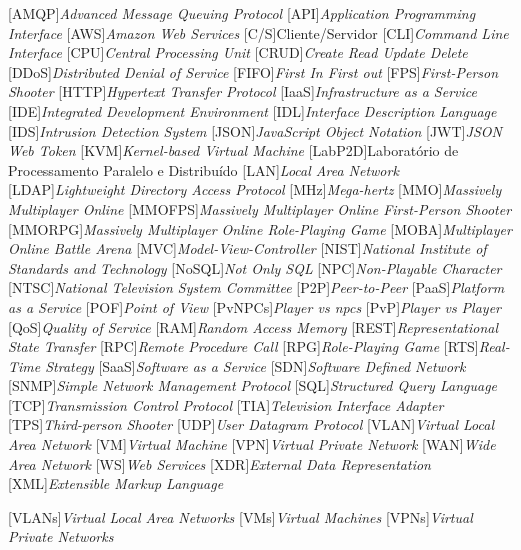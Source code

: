 \begin{acronym}[]
	[AMQP]{{\it Advanced Message Queuing Protocol}}
	[API]{{\it Application Programming Interface}}
  	[AWS]{{\it Amazon Web Services}}
	[C/S]{{Cliente/Servidor}}
	[CLI]{{\it Command Line Interface}}
	[CPU]{{\it Central Processing Unit}}
	[CRUD]{{\it Create Read Update Delete}}
	[DDoS]{{\it Distributed Denial of Service}}
	[FIFO]{{\it First In First out}}
	[FPS]{{\it First-Person Shooter}}
	[HTTP]{{\it Hypertext Transfer Protocol}}
	[IaaS]{{\it Infrastructure as a Service}}
	[IDE]{{\it Integrated Development Environment}}
	[IDL]{{\it Interface Description Language}}
  	[IDS]{{\it Intrusion Detection System}}
	[JSON]{{\it JavaScript Object Notation}}
	[JWT]{{\it JSON Web Token}}
	[KVM]{{\it Kernel-based Virtual Machine}}
	[LabP2D]{{Laboratório de Processamento Paralelo e Distribuído}}
	[LAN]{{\it Local Area Network}}
  	[LDAP]{{\it Lightweight Directory Access Protocol}}
	[MHz]{{\it Mega-hertz}}
	[MMO]{{\it Massively Multiplayer Online}}
	[MMOFPS]{{\it Massively Multiplayer Online First-Person Shooter}}
	[MMORPG]{{\it Massively Multiplayer Online Role-Playing Game}}
	[MOBA]{{\it Multiplayer Online Battle Arena}}
	[MVC]{{\it Model-View-Controller}}
	[NIST]{{\it National Institute of Standards and Technology}}
	[NoSQL]{{\it Not Only SQL}}
	[NPC]{{\it Non-Playable Character}}
	[NTSC]{{\it National Television System Committee}}
	[P2P]{{\it Peer-to-Peer}}
	[PaaS]{{\it Platform as a Service}}
	[POF]{{\it Point of View}}
	[PvNPCs]{{\it Player vs \acp{npc}}}
	[PvP]{{\it Player vs Player}}
	[QoS]{{\it Quality of Service}}
	[RAM]{{\it Random Access Memory}}
	[REST]{{\it Representational State Transfer}}
	[RPC]{{\it Remote Procedure Call}}
	[RPG]{{\it Role-Playing Game}}
	[RTS]{{\it Real-Time Strategy}}
	[SaaS]{{\it Software as a Service}}
	[SDN]{{\it Software Defined Network}}
	[SNMP]{{\it Simple Network Management Protocol}}
	[SQL]{{\it Structured Query Language}}
	[TCP]{{\it Transmission Control Protocol}}
	[TIA]{{\it Television Interface Adapter}}
	[TPS]{{\it Third-person Shooter}}
	[UDP]{{\it User Datagram Protocol}}
	[VLAN]{{\it Virtual Local Area Network}}
	[VM]{{\it Virtual Machine}}
	[VPN]{{\it Virtual Private Network}}
	[WAN]{{\it Wide Area Network}}
	[WS]{{\it Web Services}}
	[XDR]{{\it External Data Representation}}
	[XML]{{\it Extensible Markup Language}}



	[VLANs]{{\it Virtual Local Area Networks}}
	[VMs]{{\it Virtual Machines}}
	[VPNs]{{\it Virtual Private Networks}}
\end{acronym}


